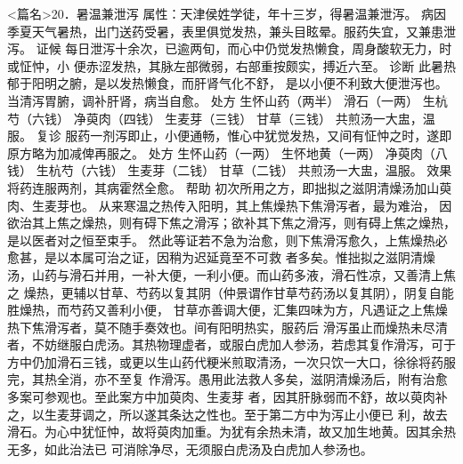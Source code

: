 \documentclass[a4paper,12pt,UTF8,twoside]{ctexbook}
\begin{document}
<篇名>20．暑温兼泄泻
属性：天津侯姓学徒，年十三岁，得暑温兼泄泻。 
病因 季夏天气暑热，出门送药受暑，表里俱觉发热，兼头目眩晕。服药失宜，又兼患泄泻。 
证候 每日泄泻十余次，已逾两旬，而心中仍觉发热懒食，周身酸软无力，时或怔忡，小 
便赤涩发热，其脉左部微弱，右部重按颇实，搏近六至。 
诊断 此暑热郁于阳明之腑，是以发热懒食，而肝肾气化不舒， 
是以小便不利致大便泄泻也。当清泻胃腑，调补肝肾，病当自愈。 
处方 生怀山药（两半） 滑石（一两） 生杭芍（六钱） 净萸肉（四钱） 
生麦芽（三钱） 甘草（三钱） 
共煎汤一大盅，温服。 
复诊 服药一剂泻即止，小便通畅，惟心中犹觉发热，又间有怔忡之时，遂即原方略为加减俾再服之。 
处方 生怀山药（一两） 生怀地黄（一两） 净萸肉（八钱） 生杭芍（六钱） 
生麦芽（二钱） 甘草（二钱） 
共煎汤一大盅，温服。 
效果 将药连服两剂，其病霍然全愈。 
帮助 初次所用之方，即拙拟之滋阴清燥汤加山萸肉、生麦芽也。 
从来寒温之热传入阳明，其上焦燥热下焦滑泻者，最为难治， 
因欲治其上焦之燥热，则有碍下焦之滑泻；欲补其下焦之滑泻，则有碍上焦之燥热，是以医者对之恒至束手。 
然此等证若不急为治愈，则下焦滑泻愈久，上焦燥热必愈甚，是以本属可治之证，因稍为迟延竟至不可救 
者多矣。惟拙拟之滋阴清燥汤，山药与滑石并用，一补大便，一利小便。而山药多液，滑石性凉，又善清上焦之 
燥热，更辅以甘草、芍药以复其阴（仲景谓作甘草芍药汤以复其阴），阴复自能胜燥热，而芍药又善利小便， 
甘草亦善调大便，汇集四味为方，凡遇证之上焦燥热下焦滑泻者，莫不随手奏效也。间有阳明热实，服药后 
滑泻虽止而燥热未尽清者，不妨继服白虎汤。其热物理虚者，或服白虎加人参汤，若虑其复作滑泻，可于 
方中仍加滑石三钱，或更以生山药代粳米煎取清汤，一次只饮一大口，徐徐将药服完，其热全消，亦不至复 
作滑泻。愚用此法救人多矣，滋阴清燥汤后，附有治愈多案可参观也。至此案方中加萸肉、生麦芽 
者，因其肝脉弱而不舒，故以萸肉补之，以生麦芽调之，所以遂其条达之性也。至于第二方中为泻止小便已 
利，故去滑石。为心中犹怔忡，故将萸肉加重。为犹有余热未清，故又加生地黄。因其余热无多，如此治法已 
可消除净尽，无须服白虎汤及白虎加人参汤也。 
\end{document}
